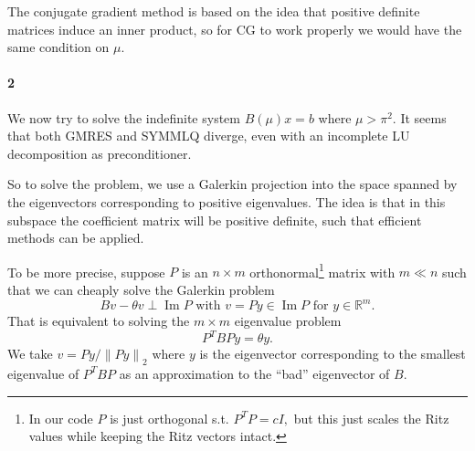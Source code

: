 \documentclass[a4paper]{article}
\newcommand{\norm}[1]{\left\lVert#1\right\rVert}
\DeclareMathOperator{\Ima}{Im}
\begin{document}
  The conjugate gradient method is based on the idea that positive definite matrices induce an inner product, so for CG to work properly we would have the same condition on $\mu.$
  \paragraph{2} We now try to solve the indefinite system $B(\mu)x = b$ where $\mu > \pi^2.$ It seems that both GMRES and SYMMLQ diverge, even with an incomplete LU decomposition as preconditioner.

  So to solve the problem, we use a Galerkin projection into the space spanned by the eigenvectors corresponding to positive eigenvalues. The idea is that in this subspace the coefficient matrix will be positive definite, such that efficient methods can be applied.

  To be more precise, suppose $P$ is an $n \times m$ orthonormal\footnote{In our code $P$ is just orthogonal s.t. $P^TP = c I,$ but this just scales the Ritz values while keeping the Ritz vectors intact.} matrix with $m \ll n$ such that we can cheaply solve the Galerkin problem
  \begin{equation}
    Bv - \theta v \perp \Ima P \text{ with } v = Py \in \Ima P \text{ for } y \in \mathbb{R}^m.
  \end{equation}
  That is equivalent to solving the $m \times m$ eigenvalue problem
  \begin{equation}\label{eq:problem}
    P^TBPy = \theta y.
  \end{equation}
  We take $v = Py / \norm{Py}_2$ where $y$ is the eigenvector corresponding to the smallest eigenvalue of $P^TBP$ as an approximation to the ``bad'' eigenvector of $B.$
\end{document}
